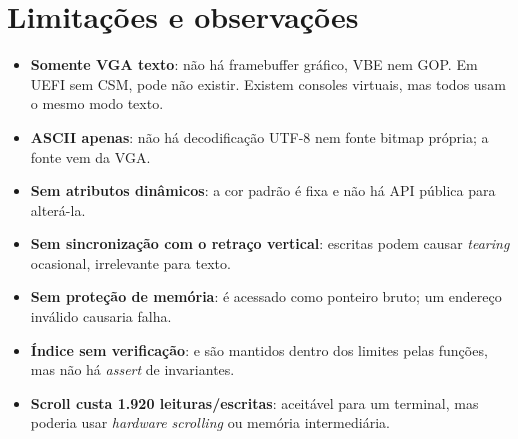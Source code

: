 \section{Limita\c{c}\~oes e observa\c{c}\~oes}

\begin{itemize}
  \item \textbf{Somente VGA texto}: n\~ao h\'a framebuffer gr\'afico, VBE
        nem GOP. Em UEFI sem CSM,  pode n\~ao existir. Existem
        consoles virtuais, mas todos usam o mesmo modo texto.
  \item \textbf{ASCII apenas}: n\~ao h\'a decodifica\c{c}\~ao UTF-8 nem
        fonte bitmap pr\'opria; a fonte vem da VGA.
  \item \textbf{Sem atributos din\^amicos}: a cor padr\~ao \'e fixa e n\~ao
        h\'a API p\'ublica para alter\'a-la.
  \item \textbf{Sem sincroniza\c{c}\~ao com o retra\c{c}o vertical}: escritas
        podem causar \emph{tearing} ocasional, irrelevante para texto.
  \item \textbf{Sem prote\c{c}\~ao de mem\'oria}:  \'e acessado
        como ponteiro bruto; um endere\c{c}o inv\'alido causaria falha.
  \item \textbf{\'Indice sem verifica\c{c}\~ao}:  e 
        s\~ao mantidos dentro dos limites pelas fun\c{c}\~oes, mas n\~ao h\'a
        \emph{assert} de invariantes.
  \item \textbf{Scroll custa 1.920 leituras/escritas}: aceit\'avel para um
        terminal, mas poderia usar \emph{hardware scrolling} ou mem\'oria
        intermedi\'aria.
\end{itemize}
